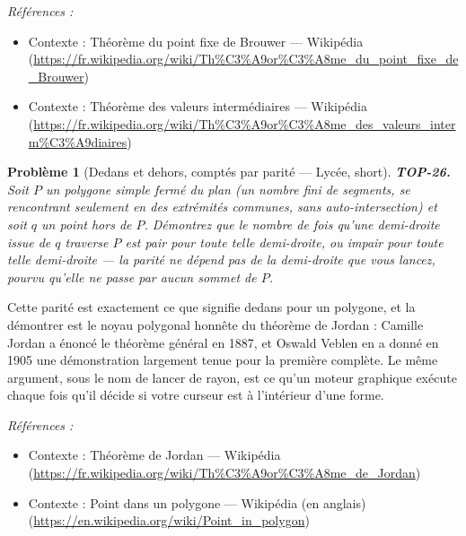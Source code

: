 \documentclass[11pt]{article}
\newtheorem{problem}{Problème}
\newenvironment{refs}{\par\small\noindent\emph{Références :}\begin{itemize}\setlength\itemsep{0pt}}{\end{itemize}\normalsize}
\begin{document}
\begin{refs}
\item Contexte : Théorème du point fixe de Brouwer --- Wikipédia (\url{https://fr.wikipedia.org/wiki/Th%C3%A9or%C3%A8me_du_point_fixe_de_Brouwer})
\item Contexte : Théorème des valeurs intermédiaires --- Wikipédia (\url{https://fr.wikipedia.org/wiki/Th%C3%A9or%C3%A8me_des_valeurs_interm%C3%A9diaires})
\end{refs}

\bigskip

\begin{problem}[{Dedans et dehors, comptés par parité --- Lycée, short}]
\textbf{TOP-26.} Soit $ P $ un polygone simple fermé du plan (un nombre fini de
segments, se rencontrant seulement en des extrémités communes, sans auto-intersection) et soit $ q $
un point hors de $ P $. Démontrez que le nombre de fois qu'une demi-droite issue de $ q $ traverse
$ P $ est pair pour toute telle demi-droite, ou impair pour toute telle demi-droite --- la parité ne
dépend pas de la demi-droite que vous lancez, pourvu qu'elle ne passe par aucun sommet de
$ P $.
\end{problem}

\noindent Cette parité est exactement ce que signifie \og{} dedans \fg{} pour un polygone, et la
démontrer est le noyau polygonal honnête du théorème de Jordan : Camille Jordan a énoncé le théorème
général en 1887, et Oswald Veblen en a donné en 1905 une démonstration largement tenue pour la première
complète. Le même argument, sous le nom de lancer de rayon, est ce qu'un moteur graphique exécute chaque
fois qu'il décide si votre curseur est à l'intérieur d'une forme.

\begin{refs}
\item Contexte : Théorème de Jordan --- Wikipédia (\url{https://fr.wikipedia.org/wiki/Th%C3%A9or%C3%A8me_de_Jordan})
\item Contexte : Point dans un polygone --- Wikipédia (en anglais) (\url{https://en.wikipedia.org/wiki/Point_in_polygon})
\end{refs}

\bigskip
\end{document}
